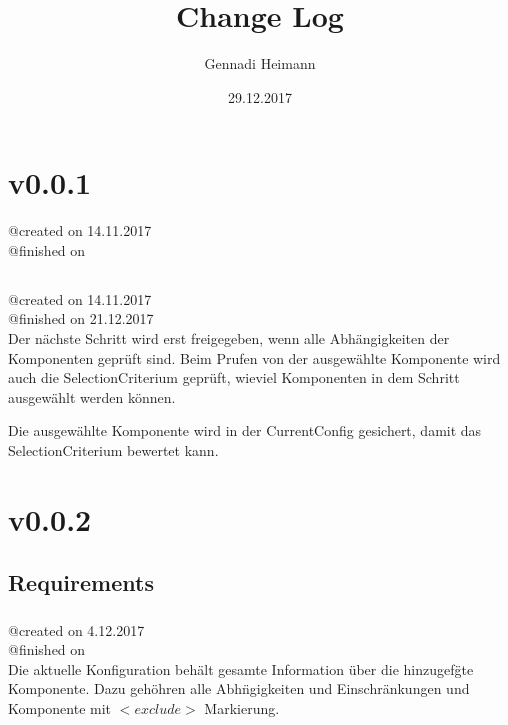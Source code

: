 \documentclass{article}
\begin{document}
\begin{titlepage}
\author{Gennadi Heimann} 
\title{Change Log} 
\date{29.12.2017} 
\maketitle
\end{titlepage}

\section{v0.0.1}
@created on 14.11.2017\\
@finished on \\

\subsection{}
@created on     14.11.2017\\
@finished on   21.12.2017\\

Der n\"achste Schritt wird erst freigegeben, wenn alle Abh\"angigkeiten 
der Komponenten gepr\"uft sind. Beim Prufen von der ausgew\"ahlte 
Komponente wird auch die SelectionCriterium gepr\"uft, wieviel Komponenten 
in dem Schritt ausgew\"ahlt werden k\"onnen.

Die ausgew\"ahlte Komponente wird in der CurrentConfig gesichert, damit das
SelectionCriterium bewertet kann.\\

\section{v0.0.2}

\subsection{Requirements}

\subsubsection{}
@created on     4.12.2017\\
@finished on   \\

Die aktuelle Konfiguration beh\"alt gesamte Information \"uber die hinzugef\"gte
Komponente. Dazu geh\"ohren alle Abh\"ngigkeiten und Einschr\"ankungen und
Komponente mit $<exclude>$ Markierung.\\
\end{document}
